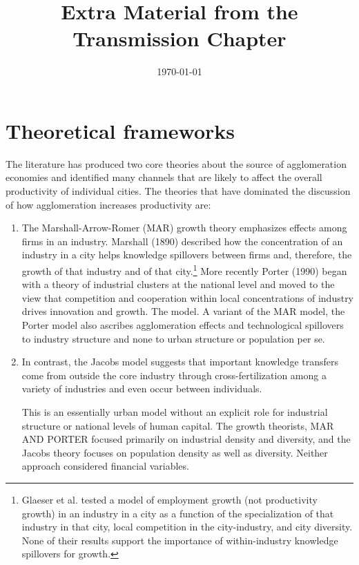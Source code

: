\documentclass[a4paper]{article}
\title{Extra Material from the Transmission Chapter}
\author{ }
\date{\today}
\theoremstyle{definition}
\theoremstyle{plain}
\begin{document}
\maketitle


\begin{abstract}
\end{abstract}

\section{Theoretical frameworks} %
{\color{green}The literature has produced two core theories about the source of agglomeration economies and identified many channels that are likely to affect the overall productivity of individual cities. The theories that have dominated the discussion of how agglomeration increases productivity are:}

\begin{enumerate}
\item The Marshall-Arrow-Romer (MAR) growth theory emphasizes effects among firms in an industry.  Marshall (1890) described how the concentration of an industry in a city helps knowledge spillovers between firms and, therefore, the growth of that industry and of that city.\footnote{Glaeser et al. \cite{glaeserGrowthCities1991} tested a model of employment growth (not productivity growth) in an industry in a city as a function of the specialization of that industry in that city, local competition in the city-industry, and city diversity. None of their results support the importance of within-industry knowledge spillovers for growth. %
} More recently Porter (1990) began with a theory of industrial clusters at the national level and moved to the view that competition and cooperation within local concentrations of industry drives innovation and growth. The model. A variant of the  MAR model, the Porter model also ascribes agglomeration effects and technological spillovers to industry structure and none to urban structure or population per se.  

\item  In contrast, the %
{Jacobs model} %
suggests that important knowledge transfers come from outside the core industry through cross-fertilization among a variety of industries and even occur between individuals.

This is an essentially urban model without an explicit role for industrial structure or national levels of human capital.  The growth theorists, MAR AND PORTER focused primarily on industrial density and diversity, and the Jacobs theory focuses on population density as well as diversity. Neither approach considered financial variables.
\end{enumerate}
\end{document}
